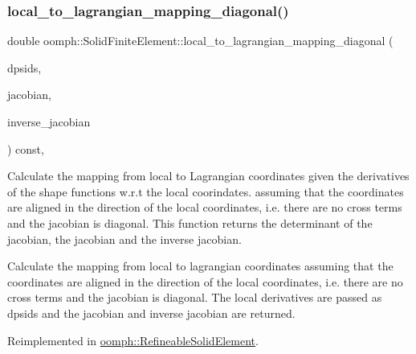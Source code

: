 \mbox{\label{classoomph_1_1SolidFiniteElement_a811c926ab4ec81ecb374030302ef28ca}} 
\subsubsection{\texorpdfstring{local\+\_\+to\+\_\+lagrangian\+\_\+mapping\+\_\+diagonal()}{local\_to\_lagrangian\_mapping\_diagonal()}}
{\footnotesize\ttfamily double oomph\+::\+Solid\+Finite\+Element\+::local\+\_\+to\+\_\+lagrangian\+\_\+mapping\+\_\+diagonal (\begin{DoxyParamCaption}\item[{const \hyperlink{classoomph_1_1DShape}{D\+Shape} \&}]{dpsids,  }\item[{\hyperlink{classoomph_1_1DenseMatrix}{Dense\+Matrix}$<$ double $>$ \&}]{jacobian,  }\item[{\hyperlink{classoomph_1_1DenseMatrix}{Dense\+Matrix}$<$ double $>$ \&}]{inverse\+\_\+jacobian }\end{DoxyParamCaption}) const\hspace{0.3cm}{\ttfamily [protected]}, {\ttfamily [virtual]}}



Calculate the mapping from local to Lagrangian coordinates given the derivatives of the shape functions w.\+r.\+t the local coorindates. assuming that the coordinates are aligned in the direction of the local coordinates, i.\+e. there are no cross terms and the jacobian is diagonal. This function returns the determinant of the jacobian, the jacobian and the inverse jacobian. 

Calculate the mapping from local to lagrangian coordinates assuming that the coordinates are aligned in the direction of the local coordinates, i.\+e. there are no cross terms and the jacobian is diagonal. The local derivatives are passed as dpsids and the jacobian and inverse jacobian are returned. 

Reimplemented in \hyperlink{classoomph_1_1RefineableSolidElement_a492846d9f2c5d5235f9f3ff1001d4ec8}{oomph\+::\+Refineable\+Solid\+Element}.



